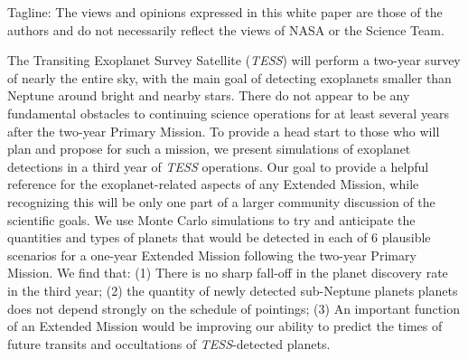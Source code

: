 \documentclass{article}
\begin{document}
Tagline: The views and opinions expressed in this white paper are those of the authors and do not necessarily reflect the views of NASA or the \tess Science Team.

The Transiting Exoplanet Survey Satellite (\textit{TESS}) will perform
a two-year survey of nearly the entire sky, with the main goal of detecting
exoplanets smaller than Neptune around bright and nearby stars. There do
not appear to be any fundamental obstacles to continuing science
operations for at least several years after the two-year Primary Mission.
To provide a head start to those who will plan and propose for such a 
mission, we present simulations of exoplanet detections in a third year of \textit{TESS}
operations. Our goal to provide a helpful reference for the exoplanet-related
aspects of any Extended Mission, while recognizing this will be only one part of
a larger community discussion of the scientific goals.
We use Monte Carlo simulations to try and anticipate the quantities and types
of planets that would be detected in each of 6 plausible scenarios for a
one-year Extended Mission following the two-year Primary Mission.
We find that: (1) There is no
sharp fall-off in the planet discovery rate in the third year; (2) the quantity of newly detected sub-Neptune planets
planets does not depend strongly on the schedule of pointings; (3) An important
function of an Extended Mission would be improving our ability to predict the times of future
transits and occultations of {\it TESS}-detected planets.
\end{document}
